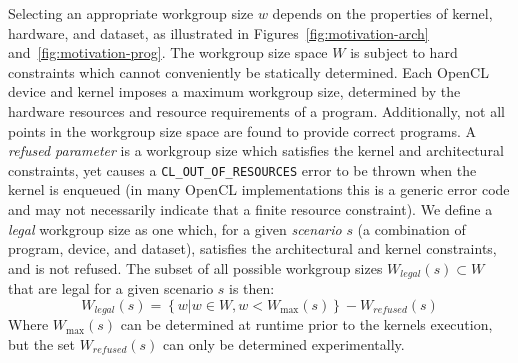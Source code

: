\documentclass[hidelinks]{acaces}
\begin{document}
Selecting an appropriate workgroup size $w$ depends on the properties
of kernel, hardware, and dataset, as illustrated in
Figures~\ref{fig:motivation-arch} and~\ref{fig:motivation-prog}. The
workgroup size space $W$ is subject to hard constraints which cannot
conveniently be statically determined. Each OpenCL device and kernel
imposes a maximum workgroup size, determined by the hardware resources
and resource requirements of a program. Additionally, not all points
in the workgroup size space are found to provide correct programs. A
\emph{refused parameter} is a workgroup size which satisfies the
kernel and architectural constraints, yet causes a
\texttt{CL\_OUT\_OF\_RESOURCES} error to be thrown when the kernel is
enqueued (in many OpenCL implementations this is a generic error code
and may not necessarily indicate that a finite resource
constraint). We define a \emph{legal} workgroup size as one which, for
a given \emph{scenario} $s$ (a combination of program, device, and
dataset), satisfies the architectural and kernel constraints, and is
not refused. The subset of all possible workgroup sizes
$W_{legal}(s) \subset W$ that are legal for a given scenario $s$ is
then:
%
\begin{equation}
  W_{legal}(s) = \left\{w | w \in W, w < W_{\max}(s) \right\} - W_{refused}(s)
\end{equation}
%
Where $W_{\max}(s)$ can be determined at runtime prior to the kernels
execution, but the set $W_{refused}(s)$ can only be determined
experimentally.
\end{document}
